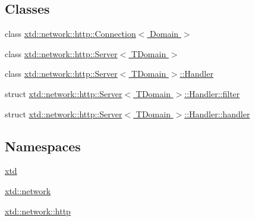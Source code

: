 \subsection*{Classes}
\begin{DoxyCompactItemize}
\item 
class \hyperlink{classxtd_1_1network_1_1http_1_1Connection}{xtd\-::network\-::http\-::\-Connection$<$ Domain $>$}
\item 
class \hyperlink{classxtd_1_1network_1_1http_1_1Server}{xtd\-::network\-::http\-::\-Server$<$ T\-Domain $>$}
\begin{DoxyCompactList}\small\item\em \par
\par
 \end{DoxyCompactList}\item 
class \hyperlink{classxtd_1_1network_1_1http_1_1Server_1_1Handler}{xtd\-::network\-::http\-::\-Server$<$ T\-Domain $>$\-::\-Handler}
\item 
struct \hyperlink{structxtd_1_1network_1_1http_1_1Server_1_1Handler_1_1filter}{xtd\-::network\-::http\-::\-Server$<$ T\-Domain $>$\-::\-Handler\-::filter}
\item 
struct \hyperlink{structxtd_1_1network_1_1http_1_1Server_1_1Handler_1_1handler}{xtd\-::network\-::http\-::\-Server$<$ T\-Domain $>$\-::\-Handler\-::handler}
\end{DoxyCompactItemize}
\subsection*{Namespaces}
\begin{DoxyCompactItemize}
\item 
\hyperlink{namespacextd}{xtd}
\item 
\hyperlink{namespacextd_1_1network}{xtd\-::network}
\item 
\hyperlink{namespacextd_1_1network_1_1http}{xtd\-::network\-::http}
\end{DoxyCompactItemize}

